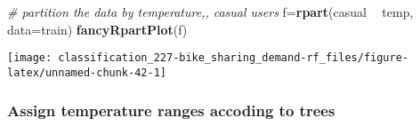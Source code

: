 \documentclass[]{book}
\newenvironment{Shaded}{\begin{snugshade}}{\end{snugshade}}
\newcommand{\CommentTok}[1]{\textcolor[rgb]{0.56,0.35,0.01}{\textit{#1}}}
\newcommand{\DataTypeTok}[1]{\textcolor[rgb]{0.13,0.29,0.53}{#1}}
\newcommand{\DecValTok}[1]{\textcolor[rgb]{0.00,0.00,0.81}{#1}}
\newcommand{\KeywordTok}[1]{\textcolor[rgb]{0.13,0.29,0.53}{\textbf{#1}}}
\newcommand{\NormalTok}[1]{#1}
\newcommand{\OperatorTok}[1]{\textcolor[rgb]{0.81,0.36,0.00}{\textbf{#1}}}
\newcommand{\StringTok}[1]{\textcolor[rgb]{0.31,0.60,0.02}{#1}}
\begin{document}
\begin{Shaded}
\begin{Highlighting}[]
\CommentTok{# partition the data by temperature,, casual users}
\NormalTok{f=}\KeywordTok{rpart}\NormalTok{(casual }\OperatorTok{~}\StringTok{ }\NormalTok{temp, }\DataTypeTok{data=}\NormalTok{train)}
\KeywordTok{fancyRpartPlot}\NormalTok{(f)}
\end{Highlighting}
\end{Shaded}

\begin{center}\texttt{[image: classification\_227-bike\_sharing\_demand-rf\_files/figure-latex/unnamed-chunk-42-1]} \end{center}

\hypertarget{assign-temperature-ranges-accoding-to-trees}{%
\subsubsection{Assign temperature ranges accoding to trees}\label{assign-temperature-ranges-accoding-to-trees}}

\begin{Shaded}
\end{Shaded}
\end{document}
